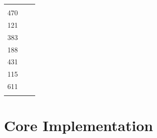 \documentclass[12pt,a4paper,twoside,openright]{report}
\theoremstyle{definition}
\begin{document}
{\begin{table}[h]
\begin{tabularx}{\textwidth}{l X c}
\begin{minipage}[t]{8cm}
  \end{minipage} & 
  \begin{minipage}[t]{0.5cm}
    2272
    \vspace{0.1\DTbaselineskip}\\
    470\\
    \vspace{\DTbaselineskip}
    121\\
    \vspace{\DTbaselineskip}
    383\\
    \vspace{1.8\DTbaselineskip}
    188\\
    \vspace{3.7\DTbaselineskip}
    431\\
    \vspace{3\DTbaselineskip}
    115\\
    \vspace{2.5\DTbaselineskip}
    611\\
  \end{minipage}
\end{tabularx}
\end{table}
}


\FloatBarrier
\section{Core Implementation}
\end{document}
